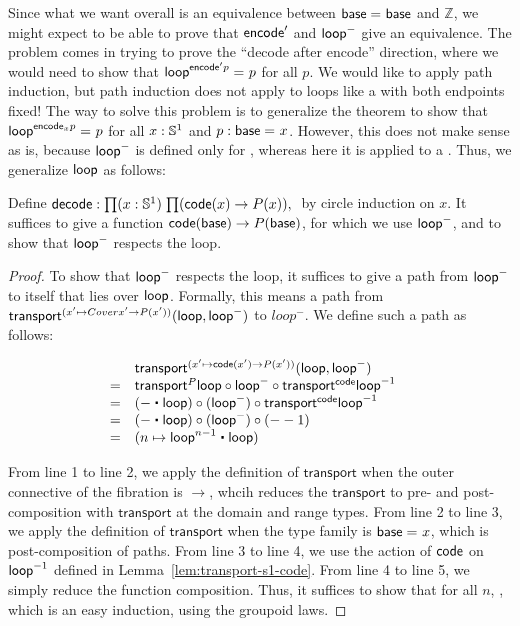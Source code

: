 Since what we want overall is an equivalence between $\mathsf{base} =_{} \mathsf{base}$
and $\mathbb{Z}$, we might expect to be able to prove that $\mathsf{encode}'$
and $\mathsf{loop}^-$ give an equivalence.  The problem comes in trying to prove
the ``decode after encode'' direction, where we would need to show that
$\mathsf{loop}^{\mathsf{encode}' p} =_{} p$ for all $p$.  We would like to apply path
induction, but path induction does not apply to loops like a with both
endpoints fixed!  The way to solve this problem is to generalize the
theorem to show that $\mathsf{loop}^{{\mathsf{encode}_x p}} =_{} p$ for all $x: \mathbb{S} ^1$
and $p : \mathsf{base} =_{} x$.  However, this does not make sense as is, because
$\mathsf{loop}^-$ is defined only for \id{\base}{\base}, whereas here it is
applied to a .  Thus, we generalize 
$\mathsf{loop}$ as follows:

\begin{defn}
Define $\decode : \prd{x : \Sn ^1}{\code(x) \rightarrow P(x)}$ by 
circle induction on $x$.  It suffices to give a function 
${\mathsf{code}(\mathsf{base}) \rightarrow P(\mathsf{base})}$, for which we use $\mathsf{loop}^-$, and 
to show that $\mathsf{loop}^-$ respects the loop.  
\end{defn}

\begin{proof}
To show that $\mathsf{loop}^-$ respects the loop, it suffices to give a path
from $\mathsf{loop}^-$ to itself that lies over $\mathsf{loop}$. 
Formally, this means a path from $\mathsf{transport}^{(x' \mapsto Cover x'
\rightarrow P(x'))}(\mathsf{loop},\mathsf{loop}^-)$ to $loop^-$.  We define such a
path as follows:

\[
\begin{array}{lll}
  & \transfib {(x' \mapsto \code(x') \rightarrow P(x'))} \lloop {\lloop^-} & \\
= & \transfibf P \lloop \circ {\lloop^-} \circ \transfibf \code {\opp \lloop} & \\
= & (- \ct \lloop) \circ (\lloop^-) \circ \transfibf \code {\opp \lloop} & \\
= & (- \ct \lloop) \circ (\lloop^-) \circ (- - 1) & \\
= & (n \mapsto \lloop^{n - 1} \ct \lloop) \\                       
\end{array}
\]

From line 1 to line 2, we apply the definition of $\mathsf{transport}$
when the outer connective of the fibration is $\rightarrow$, whcih
reduces the $\mathsf{transport}$ to pre- and post-composition with
$\mathsf{transport}$ at the domain and range types.  From line 2 to line
3, we apply the definition of $\mathsf{transport}$ when the type family
is $\mathsf{base} =_{} x$, which is post-composition of paths.  From line 3 to
line 4, we use the action of $\mathsf{code}$ on $\mathord{{\mathsf{loop}}^{-1}}$ defined in
Lemma~\ref{lem:transport-s1-code}.  From line 4 to line 5, we simply
reduce the function composition.  Thus, it suffices to show that for all
$n$, , which is an easy
induction, using the groupoid laws.  
\end{proof}

